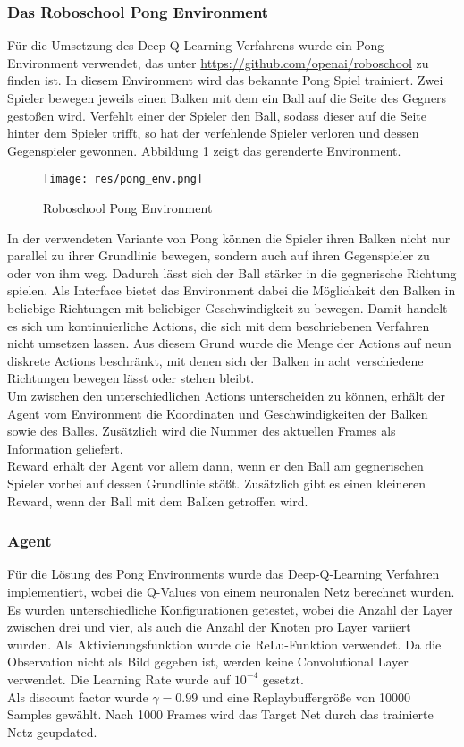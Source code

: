 \documentclass[11pt]{scrartcl}
\begin{document}
\subsubsection{Das Roboschool Pong Environment}
Für die Umsetzung des Deep-Q-Learning Verfahrens wurde ein Pong Environment verwendet, das
unter \url{https://github.com/openai/roboschool} zu finden ist. In diesem Environment wird
das bekannte Pong Spiel trainiert. Zwei Spieler bewegen jeweils einen Balken mit dem ein
Ball auf die Seite des Gegners gestoßen wird. Verfehlt einer der Spieler den Ball, sodass
dieser auf die Seite hinter dem Spieler trifft, so hat der verfehlende Spieler verloren
und dessen Gegenspieler gewonnen. Abbildung \ref{fig:pong_env} zeigt das gerenderte
Environment.

\begin{figure}[htp]
\centering
\texttt{[image: res/pong\_env.png]}
\caption{Roboschool Pong Environment}
\label{fig:pong_env}
\end{figure}
\noindent
In der verwendeten Variante von Pong können die Spieler ihren Balken nicht nur parallel zu
ihrer Grundlinie bewegen, sondern auch auf ihren Gegenspieler zu oder von ihm weg. Dadurch
lässt sich der Ball stärker in die gegnerische Richtung spielen. Als Interface bietet das
Environment dabei die Möglichkeit den Balken in beliebige Richtungen mit beliebiger
Geschwindigkeit zu bewegen. Damit handelt es sich um kontinuierliche Actions, die sich mit
dem beschriebenen Verfahren nicht umsetzen lassen. Aus diesem Grund wurde die Menge der
Actions auf neun diskrete Actions beschränkt, mit denen sich der Balken in acht
verschiedene Richtungen bewegen lässt oder stehen bleibt.\\
Um zwischen den unterschiedlichen Actions unterscheiden zu können, erhält der Agent vom
Environment die Koordinaten und Geschwindigkeiten der Balken sowie des Balles. Zusätzlich
wird die Nummer des aktuellen Frames als Information geliefert.\\
Reward erhält der Agent vor allem dann, wenn er den Ball am gegnerischen Spieler vorbei
auf dessen Grundlinie stößt. Zusätzlich gibt es einen kleineren Reward, wenn der Ball mit
dem Balken getroffen wird.

\subsubsection{Agent}
Für die Lösung des Pong Environments wurde das Deep-Q-Learning Verfahren implementiert,
wobei die Q-Values von einem neuronalen Netz berechnet wurden. Es wurden unterschiedliche
Konfigurationen getestet, wobei die Anzahl der Layer zwischen drei und vier, als auch die
Anzahl der Knoten pro Layer variiert wurden. Als Aktivierungsfunktion wurde die
ReLu-Funktion verwendet. Da die Observation nicht als Bild gegeben ist, werden keine
Convolutional Layer verwendet. Die Learning Rate wurde auf $10^{-4}$ gesetzt.\\
Als discount factor wurde $\gamma = 0.99$ und eine Replaybuffergröße von 10000
Samples gewählt. Nach 1000 Frames wird das Target Net durch das trainierte Netz geupdated.
\end{document}
